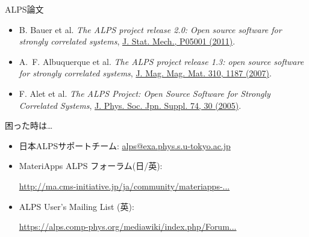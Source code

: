 \begin{frame}[t,fragile]{ALPS論文}
  \begin{itemize}
    \setlength{\itemsep}{1em}
  \item B. Bauer et al. {\it The ALPS project release 2.0: Open source software for strongly correlated systems}, \href{http://iopscience.iop.org/1742-5468/2011/05/P05001}{J. Stat. Mech., P05001 (2011)}.
  \item A.~F. Albuquerque et al. {\it The ALPS project release 1.3: open source software for strongly correlated systems}, \href{http://dx.doi.org/10.1016/j.jmmm.2006.10.304}{J. Mag. Mag. Mat. 310, 1187 (2007)}.
  \item F. Alet et al. {\it The ALPS Project: Open Source Software for
      Strongly Correlated Systems}, \href{http://jpsj.ipap.jp/link?JPSJS/74S/30}{J. Phys. Soc. Jpn. Suppl. 74, 30 (2005)}.
  \end{itemize}
\end{frame}

\begin{frame}[t,fragile]{困った時は…}
  \begin{itemize}
    \setlength{\itemsep}{1em}
  \item 日本ALPSサポートチーム: {\footnotesize \href{mailto:alps@exa.phys.s.u-tokyo.ac.jp}{alps@exa.phys.s.u-tokyo.ac.jp}}
  \item MateriApps ALPS フォーラム(日/英):

    {\footnotesize \href{http://ma.cms-initiative.jp/ja/community/materiapps-messageboard/alps}{http://ma.cms-initiative.jp/ja/community/materiapps-...}}
  \item ALPS User's Mailing List (英):

    {\footnotesize \href{https://alps.comp-phys.org/mediawiki/index.php/Forum:Overview}{https://alps.comp-phys.org/mediawiki/index.php/Forum...}}
  \end{itemize}
\end{frame}

